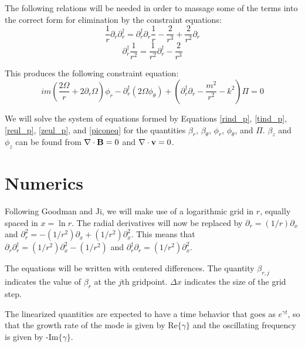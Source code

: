 \documentclass[letterpaper]{article}
\begin{document}
The following relations will be needed in order to massage some of the
terms into the correct form for elimination by the constraint
equations:
\begin{equation}
\frac{1}{r}\partial_r \partial_r^\dagger = \partial_r^\dagger \partial_r \frac{1}{r} - \frac{2}{r^3} + \frac{2}{r^2}\partial_r
\end{equation}
\begin{equation}
\partial_r^\dagger \frac{1}{r^2} = \frac{1}{r^2} \partial_r^\dagger - \frac{2}{r^3}
\end{equation}

This produces the following constraint equation:
\begin{equation}\label{piconeq}
im\left(\frac{2\Omega}{r}+2\partial_r \Omega\right)\phi_r - \partial_r^\dagger\left(2\Omega\phi_\theta\right)+\left(\partial_r^\dagger \partial_r - \frac{m^2}{r^2}-k^2\right)\Pi = 0
\end{equation}

We will solve the system of equations formed by Equations
\ref{rind_p}, \ref{tind_p}, \ref{reul_p}, \ref{zeul_p}, and
\ref{piconeq} for the quantities $\beta_r$, $\beta_\theta$, $\phi_r$,
$\phi_\theta$, and $\Pi$.  $\beta_z$ and $\phi_z$ can be found from
$\nabla\cdot{\bf B}=0$ and $\nabla\cdot{\bf v}=0$.
\section{Numerics}

Following Goodman and Ji, we will make use of a logarithmic grid in
$r$, equally spaced in $x=\ln{r}$.  The radial derivatives will now be
replaced by $\partial_r = (1/r)\partial_x$ and $\partial_r^2 =
-(1/r^2)\partial_x + (1/r^2)\partial_x^2$.  This means that
$\partial_r \partial_r^\dagger = (1/r^2)\partial_x^2 - (1/r^2)$ and
$\partial_r^\dagger \partial_r = (1/r^2)\partial_x^2$.

The equations will be written with centered differences.  The quantity
$\beta_{r,j}$ indicates the value of $\beta_r$ at the $j$th
gridpoint. $\Delta x$ indicates the size of the grid step.

The linearized quantities are expected to have a time behavior that
goes as $e^{\gamma t}$, so that the growth rate of the mode is given
by $\mathrm{Re}\{\gamma\}$ and the oscillating frequency is given by
-$\mathrm{Im}\{\gamma\}$.
\end{document}
